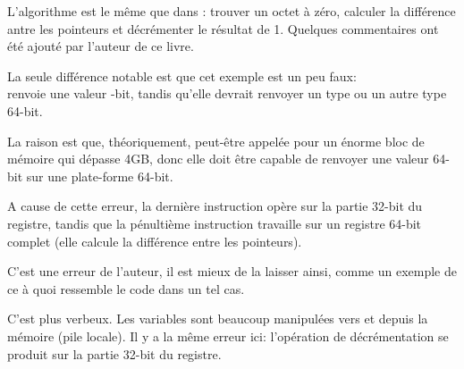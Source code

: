 ﻿




L'algorithme est le même que dans :
trouver un octet à zéro, calculer la différence antre les pointeurs et décrémenter
le résultat de 1.
Quelques commentaires ont été ajouté par l'auteur de ce livre.

La seule différence notable est que cet exemple est un peu faux: \\
 renvoie une valeur -bit, tandis qu'elle devrait renvoyer
un type  ou un autre type 64-bit.

La raison est que, théoriquement,  peut-être appelée pour un énorme
bloc de mémoire qui dépasse 4GB, donc elle doit être capable de renvoyer une valeur
64-bit sur une plate-forme 64-bit.

A cause de cette erreur, la dernière instruction \SUB opère sur la partie 32-bit
du registre, tandis que la pénultième instruction \SUB travaille sur un registre
64-bit complet (elle calcule la différence entre les pointeurs).

C'est une erreur de l'auteur, il est mieux de la laisser ainsi, comme un exemple
de ce à quoi ressemble le code dans un tel cas.




C'est plus verbeux.
Les variables sont beaucoup manipulées vers et depuis la mémoire (pile locale).
Il y a la même erreur ici: l'opération de décrémentation se produit sur la partie
32-bit du registre.
